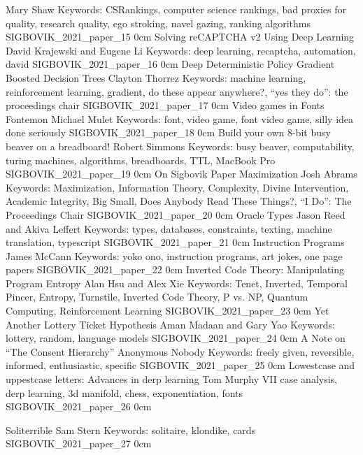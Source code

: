 	{Mary Shaw}
	{Keywords: CSRankings, computer science rankings, bad proxies for quality, research quality, ego stroking, navel gazing, ranking algorithms}
	{SIGBOVIK_2021_paper_15}
	{0cm}
	{}
\addpaper
	{Solving reCAPTCHA v2 Using Deep Learning}
	{David Krajewski and Eugene Li}
	{Keywords: deep learning, recaptcha, automation, david}
	{SIGBOVIK_2021_paper_16}
	{0cm}
	{}
\addpaper
	{Deep Deterministic Policy Gradient Boosted Decision Trees}
	{Clayton Thorrez}
	{Keywords: machine learning, reinforcement learning, gradient, do these appear anywhere?, ``yes they do'': the proceedings chair}
	{SIGBOVIK_2021_paper_17}
	{0cm}
	{}
\addpaper
	{Video games in Fonts Fontemon}
	{Michael Mulet}
	{Keywords: font, video game, font video game, silly idea done seriously}
	{SIGBOVIK_2021_paper_18}
	{0cm}
	{}
\addpaper
	{Build your own 8-bit busy beaver on a breadboard!}
	{Robert Simmons}
	{Keywords: busy beaver, computability, turing machines, algorithms, breadboards, TTL, MacBook Pro}
	{SIGBOVIK_2021_paper_19}
	{0cm}
	{}
\addpaper
	{On Sigbovik Paper Maximization}
	{Josh Abrams}
	{Keywords: Maximization, Information Theory, Complexity, Divine Intervention, Academic Integrity, Big Small, Does Anybody Read These Things?, ``I Do'': The Proceedings Chair}
	{SIGBOVIK_2021_paper_20}
	{0cm}
	{}
\addpaper
	{Oracle Types}
	{Jason Reed and Akiva Leffert}
	{Keywords: types, databases, constraints, texting, machine translation, typescript}
	{SIGBOVIK_2021_paper_21}
	{0cm}
	{}
\addpaper
	{Instruction Programs}
	{James McCann}
	{Keywords: yoko ono, instruction programs, art jokes, one page papers}
	{SIGBOVIK_2021_paper_22}
	{0cm}
	{}
\addpaper
	{Inverted Code Theory: Manipulating Program Entropy}
	{Alan Hsu and Alex Xie}
	{Keywords: Tenet, Inverted, Temporal Pincer, Entropy, Turnstile, Inverted Code Theory, P vs. NP, Quantum Computing, Reinforcement Learning}
	{SIGBOVIK_2021_paper_23}
	{0cm}
	{}
\addpaper
	{Yet Another Lottery Ticket Hypothesis}
	{Aman Madaan and Gary Yao}
	{Keywords: lottery, random, language models}
	{SIGBOVIK_2021_paper_24}
	{0cm}
	{}
\addpaper
	{A Note on ``The Consent Hierarchy''}
	{Anonymous Nobody}
	{Keywords: freely given, reversible, informed, enthusiastic, specific}
	{SIGBOVIK_2021_paper_25}
	{0cm}
	{}
\addpaper
	{Lowestcase and uppestcase letters: Advances in derp learning}
	{Tom Murphy VII}
	{case analysis, derp learning, 3d manifold, chess, exponentiation, fonts}
	{SIGBOVIK_2021_paper_26}
	{0cm}
	{}

\addpaper
	{Soliterrible}
	{Sam Stern}
	{Keywords: solitaire, klondike, cards}
	{SIGBOVIK_2021_paper_27}
	{0cm}
	{}

